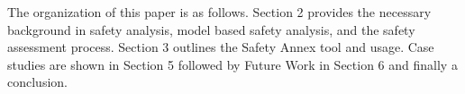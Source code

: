 The organization of this paper is as follows. Section 2 provides the necessary background in safety analysis, model based safety analysis, and the safety assessment process. Section 3 outlines the Safety Annex tool and usage. Case studies are shown in Section 5 followed by Future Work in Section 6 and finally a conclusion. 

